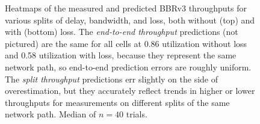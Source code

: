 \begin{figure}[t]
    \caption{Heatmaps of the measured and predicted BBRv3 throughputs for
     various splits of delay, bandwidth, and loss, both without (top) and with
     (bottom) loss.
     The \textit{end-to-end throughput} predictions (not pictured) are the same for all
     cells at 0.86 utilization without loss and 0.58 utilization with loss,
     because they represent the same network path, so end-to-end
     prediction errors are roughly uniform.
     The \textit{split throughput} predictions err slightly on the side of
     overestimation, but they accurately reflect trends in higher or lower throughputs for
     measurements on different splits of the same network path. Median of $n=40$ trials.}
    \label{fig:splitting:accuracy}
\end{figure}
